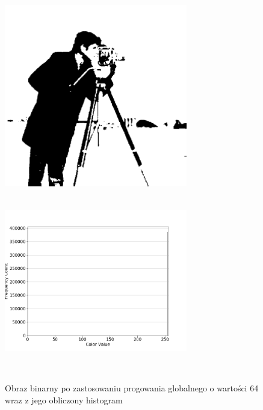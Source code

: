 \documentclass[a4paper,12pt]{book}
\begin{document}
\begin{figure}[H]
	\caption{Obraz binarny po zastosowaniu progowania globalnego o wartości 64 wraz z jego obliczony histogram}
	\includegraphics[width=8cm, height=8cm]{5-5/global-threshold-image-photoman-64.png}
	\includegraphics[width=8cm, height=8cm]{5-5/global-threshold-photoman-64.png}
	

\end{figure}
\end{document}

